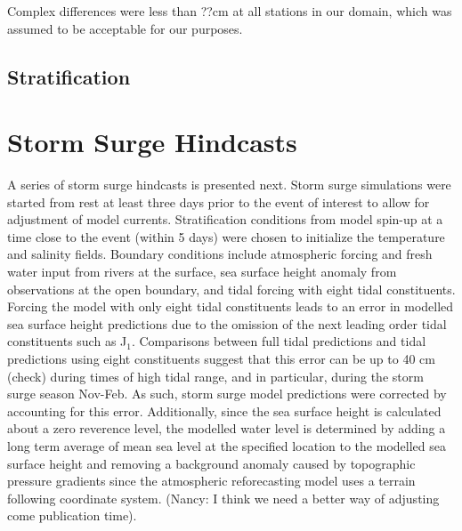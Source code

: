 \documentclass[pdftex,10pt]{article}
\begin{document}
Complex differences were less than ??cm at all stations in our domain, which was assumed to be acceptable for our purposes. 

\subsection{Stratification} 

\section{Storm Surge Hindcasts}\label{sec:storm}
A series of storm surge hindcasts is presented next. Storm surge simulations were started from rest at least three days prior to the event of interest to allow for adjustment of model currents. Stratification conditions from model spin-up at a time close to the event (within 5 days) were chosen to initialize the temperature and salinity fields. Boundary conditions include atmospheric forcing and fresh water input from rivers at the surface, sea surface height anomaly from observations at the open boundary, and tidal forcing with eight tidal constituents. Forcing the model with only eight tidal constituents leads to an error in modelled sea surface height predictions due to the omission of the next leading order tidal constituents such as J$_1$. Comparisons between full tidal predictions and tidal predictions using eight constituents suggest that this error can be up to 40 cm (check) during times of high tidal range, and in particular, during the storm surge season Nov-Feb. As such, storm surge model predictions were corrected by accounting for this error. Additionally, since the sea surface height is calculated about a zero reverence level, the modelled water level is determined by adding a long term average of mean sea level at the specified location to the modelled sea surface height and removing a background anomaly caused by topographic pressure gradients since the atmospheric reforecasting model uses a terrain following coordinate system. (Nancy: I think we need a better way of adjusting come publication time).
\end{document}
